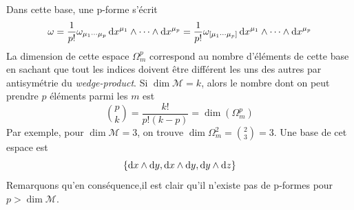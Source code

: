 Dans cette base, une p-forme s'écrit
\begin{equation}
    \omega = \frac{1}{p!}\omega_{\mu_1 \cdots \mu_p}\,\mathrm{d} x^{\mu_1}\wedge \cdots \wedge \mathrm{d} x^{\mu_p} =\frac{1}{p!}\omega_{[\mu_1 \cdots \mu_p]}\,\mathrm{d} x^{\mu_1}\wedge \cdots \wedge \mathrm{d} x^{\mu_p}
\end{equation}
La dimension de cette espace $\Omega^{p}_m$ correspond au nombre d'éléments de cette base en sachant que tout les indices doivent être différent les uns des autres par antisymétrie du \emph{wedge-product}. Si $\dim \mathcal{M} = k$, alors le nombre dont on peut prendre $p$ éléments parmi les $m$ est 
\begin{equation*}
{p \choose k} = \frac{k!}{p!(k-p)} = \dim(\Omega^{p}_m)
\end{equation*}
Par exemple, pour $\dim \mathcal{M} = 3$, on trouve $\dim \Omega_m^2 = {2\choose 3} = 3$. Une base de cet espace est
\begin{equation}
    \{\mathrm{d} x \wedge \mathrm{d} y , \mathrm{d} x \wedge \mathrm{d} y , \mathrm{d} y \wedge \mathrm{d} z\}
\end{equation} 
Remarquons qu'en conséquence,il est clair qu'il n'existe pas de p-formes pour $p>\dim \mathcal{M}$.


